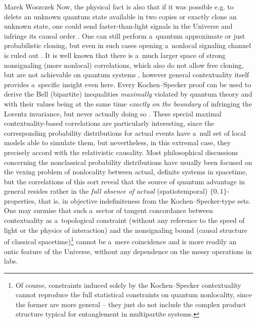 \begin{artengenv}{Marek Woszczek}
Now, the physical fact is also that if it was possible e.g. to delete an unknown quantum state available in two copies or exactly clone an unknown state, one could send faster-than-light signals in the Universe and infringe its causal order
\parencites[][]{gisin_quantum_1998}[][]{pati_quantum_2003}. %
 One can still perform a~quantum approximate or just probabilistic cloning, but even in such cases opening a~nonlocal signaling channel is ruled out 
\parencites[][]{pati_probabilistic_2000}[][]{bruss_approximate_2000}. %
 It is well known that there is a~much larger space of strong nonsignaling (more nonlocal) correlations, which also do not allow free cloning, but are not achievable on quantum systems 
\parencite[][]{masanes_general_2006}, %
 however general contextuality itself provides a~specific insight even here. Every Kochen–Specker proof can be used to derive the Bell (bipartite) inequalities \textit{maximally} violated by quantum theory and with their values being at the same time \textit{exactly on the boundary} of infringing the Lorentz invariance, but never actually doing so 
\parencite[][]{aolita_fully_2012}. %
 These special maximal contextuality-based correlations are particularly interesting, since the corresponding probability distributions for actual events have a~null set of local models able to simulate them, but nevertheless, in this extremal case, they precisely accord with the relativistic causality. Most philosophical discussions concerning the nonclassical probability distributions have usually been focused on the vexing problem of nonlocality between actual, definite systems in spacetime, but the correlations of this sort reveal that the source of quantum advantage in general resides rather in the \textit{full absence of actual} (spatiotemporal) $\{0,1\}$-properties, that is, in objective indefiniteness from the Kochen–Specker-type sets. One may surmise that such a~sector of tangent concordance between contextuality as a~topological constraint (without any reference to the speed of light or the physics of interaction) and the nonsignaling bound (causal structure of classical spacetime)\footnote{Of course, constraints induced solely by the Kochen–Specker contextuality cannot reproduce the full statistical constraints on quantum nonlocality, since the former are more general -- they just do not include the complex product structure typical for entanglement in multipartite systems.} cannot be a~mere coincidence and is more readily an ontic feature of the Universe, without any dependence on the messy operations in labs.


\end{artengenv}
